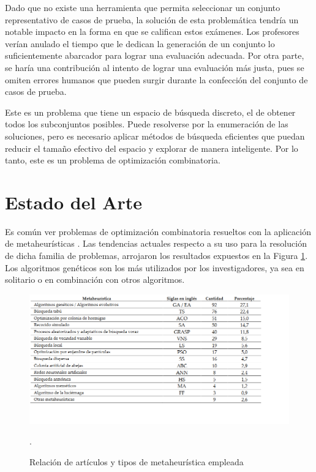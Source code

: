 \documentclass[a4paper,openright,11pt,oneside]{book}
\begin{document}
		Dado que no existe una herramienta que permita seleccionar un conjunto representativo de casos de prueba, la solución de esta problemática tendría un notable impacto en la forma en que se califican estos exámenes. Los profesores verían anulado el tiempo que le dedican la generación de un conjunto lo suficientemente abarcador para lograr una evaluación adecuada. Por otra parte, se haría una contribución al intento de lograr una evaluación más justa, pues se omiten errores humanos que pueden surgir durante la confección del conjunto de casos de prueba.
		
		Este es un problema que tiene un espacio de búsqueda discreto, el de obtener todos los subconjuntos posibles. Puede resolverse por la enumeración de las soluciones, pero es necesario aplicar métodos de búsqueda eficientes que puedan  reducir  el  tamaño efectivo del espacio y explorar de manera inteligente. Por lo tanto, este es un problema de optimización combinatoria.

		
	\section{Estado del Arte}
	Es común ver problemas de optimización combinatoria resueltos con la aplicación de metaheurísticas \cite{marti2003procedimientos}. Las tendencias actuales respecto a su uso para la resolución de dicha familia de problemas, arrojaron los resultados expuestos en la Figura \ref{EoAmetaheuristicas}. Los algoritmos genéticos son los más utilizados por los investigadores, ya sea en solitario o en combinación con otros algoritmos. \\
	
	\begin{figure}[h]
		\centering
		\includegraphics[scale=0.8]{./Graphics/EoAmetaheuristicas.png}
		\caption{Relación de artículos y tipos de metaheurística empleada} \cite{EOAgomez2014metaheuristicas}.
		\label{EoAmetaheuristicas}
	\end{figure}
	
\end{document}
